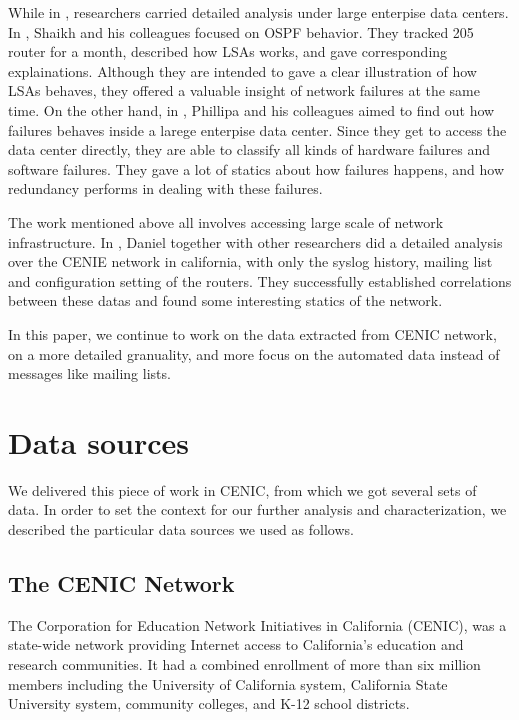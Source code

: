 \documentclass[conference, twocolumn, oneside, 10pt]{IEEEtran}
\begin{document}
While in \cite{Shaikh:2002:CSO:637201.637236, Gill:2011:UNF:2018436.2018477}, researchers carried detailed analysis under large enterpise data centers. In \cite{Shaikh:2002:CSO:637201.637236}, Shaikh and his colleagues focused on OSPF behavior. They tracked 205 router for a month, described how LSAs works, and gave corresponding explainations. Although they are intended to gave a clear illustration of how LSAs behaves, they offered a valuable insight of network failures at the same time. On the other hand, in \cite{Gill:2011:UNF:2018436.2018477}, Phillipa and his colleagues aimed to find out how failures behaves inside a larege enterpise data center. Since they get to access the data center directly, they are able to classify all kinds of hardware failures and software failures. They gave a lot of statics about how failures happens, and how redundancy performs in dealing with these failures. 

The work mentioned above all involves accessing large scale of network infrastructure. In \cite{turner2010california}, Daniel together with other researchers did a detailed analysis over the CENIE network in california, with only the syslog history, mailing list and configuration setting of the routers. They successfully established correlations between these datas and found some interesting statics of the network.

In this paper, we continue to work on the data extracted from CENIC network, on a more detailed granuality, and more focus on the automated data instead of messages like mailing lists.

\section{Data sources}
\label{sec:sec3}

We delivered this piece of work in CENIC, from which we got several sets of data. In order to set the context for our further analysis and characterization, we described the particular data sources we used as follows.

\subsection{The CENIC Network}

The Corporation for Education Network Initiatives in California (CENIC), was a state-wide network providing Internet access to California's education and research communities.\cite{cenic2013online} It had a combined enrollment of more than six million members including the University of California system, California State University system, community colleges, and K-12 school districts.
\end{document}
